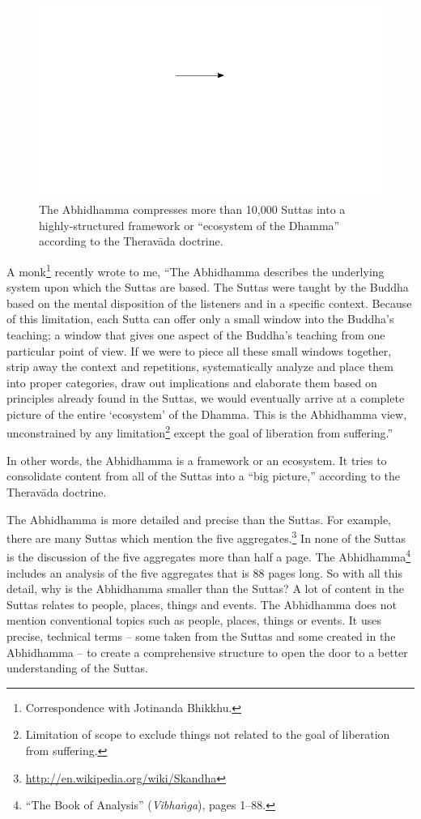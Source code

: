 \begin{figure}[H]
\centering
\includegraphics[width=0.25\linewidth]{./Diagrams/Funnel}
\caption{The Abhidhamma compresses more than 10,000 Suttas into a highly-structured framework or “ecosystem of the Dhamma” according to the Theravāda doctrine.}
\label{fig:Funnel}
\end{figure}

A monk\footnote{Correspondence with Jotinanda Bhikkhu.} recently wrote to me, “The Abhidhamma describes the underlying system upon which the Suttas are based. The Suttas were taught by the Buddha based on the mental disposition of the listeners and in a specific context. Because of this limitation, each Sutta can offer only a small window into the Buddha’s teaching; a window that gives one aspect of the Buddha’s teaching from one particular point of view. If we were to piece all these small windows together, strip away the context and repetitions, systematically analyze and place them into proper categories, draw out implications and elaborate them based on principles already found in the Suttas, we would eventually arrive at a complete picture of the entire `ecosystem’ of the Dhamma. This is the Abhidhamma view, unconstrained by any limitation\footnote{Limitation of scope to exclude things not related to the goal of liberation from suffering.} except the goal of liberation from suffering.”

In other words, the Abhidhamma is a framework or an ecosystem. It tries to consolidate content from all of the Suttas into a “big picture,” according to the Theravāda doctrine.

The Abhidhamma is more detailed and precise than the Suttas. For example, there are many Suttas which mention the five aggregates.\footnote{\url{http://en.wikipedia.org/wiki/Skandha}} In none of the Suttas is the discussion of the five aggregates more than half a page. The Abhidhamma\footnote{“The Book of Analysis” (\textit{Vibhaṅga}), pages 1--88.} includes an analysis of the five aggregates that is 88 pages long. So with all this detail, why is the Abhidhamma smaller than the Suttas? A lot of content in the Suttas relates to people, places, things and events. The Abhidhamma does not mention conventional topics such as people, places, things or events. It uses precise, technical terms – some taken from the Suttas and some created in the Abhidhamma – to create a comprehensive structure to open the door to a better understanding of the Suttas.

